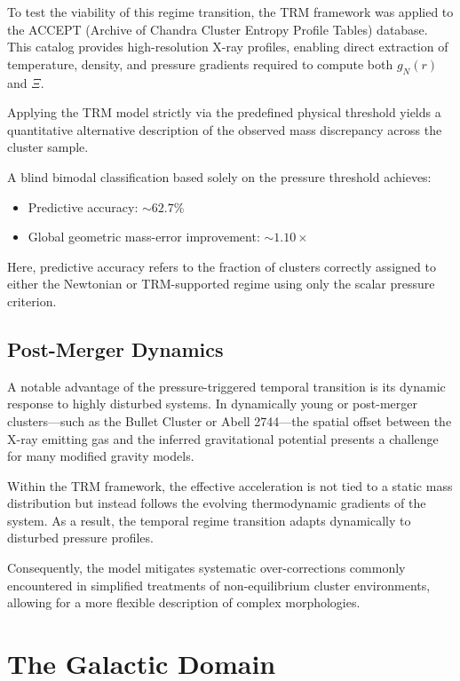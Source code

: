 \documentclass[11pt]{article}
\begin{document}
To test the viability of this regime transition, the TRM framework was applied to the ACCEPT (Archive of Chandra Cluster Entropy Profile Tables) database. This catalog provides high-resolution X-ray profiles, enabling direct extraction of temperature, density, and pressure gradients required to compute both $g_N(r)$ and $\Xi$.

Applying the TRM model strictly via the predefined physical threshold yields a quantitative alternative description of the observed mass discrepancy across the cluster sample.

A blind bimodal classification based solely on the pressure threshold achieves:

\begin{itemize}
	\item Predictive accuracy: $\sim 62.7\%$
	\item Global geometric mass-error improvement: $\sim 1.10 \times$
\end{itemize}

Here, predictive accuracy refers to the fraction of clusters correctly assigned to either the Newtonian or TRM-supported regime using only the scalar pressure criterion.

\subsection{Post-Merger Dynamics}

A notable advantage of the pressure-triggered temporal transition is its dynamic response to highly disturbed systems. In dynamically young or post-merger clusters—such as the Bullet Cluster or Abell 2744—the spatial offset between the X-ray emitting gas and the inferred gravitational potential presents a challenge for many modified gravity models.

Within the TRM framework, the effective acceleration is not tied to a static mass distribution but instead follows the evolving thermodynamic gradients of the system. As a result, the temporal regime transition adapts dynamically to disturbed pressure profiles.

Consequently, the model mitigates systematic over-corrections commonly encountered in simplified treatments of non-equilibrium cluster environments, allowing for a more flexible description of complex morphologies.


	\section{The Galactic Domain}
\end{document}
